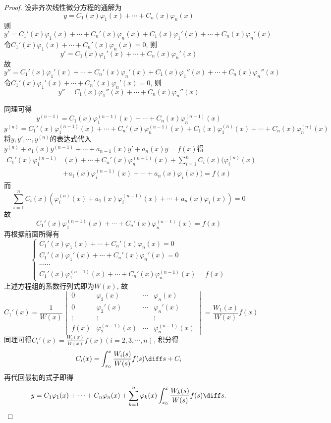 \begin{proof} 
设非齐次线性微分方程的通解为
\[y=C_1(x)\varphi_1(x)+\cdots+C_n(x)\varphi_n(x)\]
则\[y'=C_1'(x)\varphi_1(x)+\cdots+C_n'(x)\varphi_n(x)+C_1(x)\varphi_1'(x)+\cdots+C_n(x)\varphi_n'(x)\]
令$C_1'(x)\varphi_1(x)+\cdots+C_n'(x)\varphi_n(x)=0$, 则
\[y'=C_1(x)\varphi_1'(x)+\cdots+C_n(x)\varphi_n'(x)\]
故
\[y''=C_1'(x)\varphi_1'(x)+\cdots+C_n'(x)\varphi_n'(x)+C_1(x)\varphi_1''(x)+\cdots+C_n(x)\varphi_n''(x)\]
令$C_1'(x)\varphi_1'(x)+\cdots+C_n'(x)\varphi_n'(x)=0$, 则
\[y''=C_1(x)\varphi_1''(x)+\cdots+C_n(x)\varphi_n''(x)\]

同理可得\[y^{(n-1)}=C_1(x)\varphi_1^{(n-1)}(x)+\cdots+C_n(x)\varphi_n^{(n-1)}(x)\]
\[y^{(n)}=C_1'(x)\varphi_1^{(n-1)}(x)+\cdots+C_n'(x)\varphi_n^{(n-1)}(x)+C_1(x)\varphi_1^{(n)}(x)+\cdots+C_n(x)\varphi_n^{(n)}(x)\]
将$y,y',\cdots,y^{(n)}$的表达式代入$y^{(n)}+a_1(x)y^{(n-1)}+\cdots+a_{n-1}(x)y'+a_n(x)y=f(x)$得
\[\begin{split}C_1'(x)\varphi_1^{(n-1)}&(x)+\cdots+C_n'(x)\varphi_n^{(n-1)}(x)+\sum_{i=1}^nC_i(x)\bigg(\varphi_i^{(n)}(x)\\&+a_1(x)\varphi_i^{(n-1)}(x)+\cdots+a_n(x)\varphi_i(x)\bigg)=f(x)\end{split}\]
而\[\sum_{i=1}^nC_i(x)\left(\varphi_i^{(n)}(x)+a_1(x)\varphi_i^{(n-1)}(x)+\cdots+a_n(x)\varphi_i(x)\right)=0\]
故\[C_1'(x)\varphi_1^{(n-1)}(x)+\cdots+C_n'(x)\varphi_n^{(n-1)}(x)=f(x)\]
再根据前面所得有
\[\begin{cases}
C_1'(x)\varphi_1(x)+\cdots+C_n'(x)\varphi_n(x)=0\\
C_1'(x)\varphi_1'(x)+\cdots+C_n'(x)\varphi_n'(x)=0\\
\cdots\cdots\\
C_1'(x)\varphi_1^{(n-1)}(x)+\cdots+C_n'(x)\varphi_n^{(n-1)}(x)=f(x)
\end{cases}\]
上述方程组的系数行列式即为$W(x)$, 故
\[C_1'(x)=\frac{1}{W(x)}\begin{vmatrix}0&\varphi_2(x)&\cdots&\varphi_n(x)\\
0&\varphi_2'(x)&\cdots&\varphi_n'(x)\\
\vdots&\vdots&&\vdots\\
f(x)&\varphi_2^{(n-1)}(x)&\cdots&\varphi_n^{(n-1)}(x)\end{vmatrix}=\frac{W_1(x)}{W(x)}f(x)\]
同理可得$\displaystyle C_i'(x)=\frac{W_i(x)}{W(x)}f(x)(i=2,3,\cdots,n)$, 积分得
\[C_i(x)=\int_{x_0}^x\frac{W_i(s)}{W(s)}f(s)\diff s+C_i\]
再代回最初的式子即得
\[y=C_1\varphi_1(x)+\cdots+C_n\varphi_n(x)+\sum_{k=1}^n\varphi_k(x)\int_{x_0}^x\frac{W_k(s)}{W(s)}f(s)\diff s.\qedhere\]
\end{proof}



